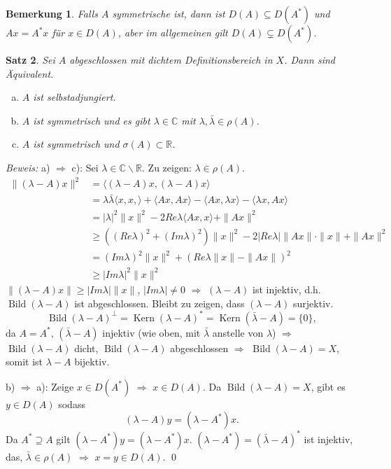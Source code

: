\documentclass[12pt]{extreport} %
\newtheorem{Satz}{Satz}[subsection]
\newtheorem{Bemerkung}[Satz]{Bemerkung}
\DeclareMathOperator{\Kern}{Kern}
\DeclareMathOperator{\Bild}{Bild}
\numberwithin{equation}{section}
\newcommand{\C}{\mathbb{C}} %
\newcommand{\R}{\mathbb{R}} %
\newcommand{\m}{\cdot}
\newcommand{\Bew}{\emph{Beweis: }}
\begin{document}
\begin{Bemerkung}
	Falls $A$ symmetrische ist, dann ist $D(A)\subseteq D(A^*)$ und $Ax = A^*x$ für $x\in D(A)$, aber im allgemeinen gilt $D(A)\subsetneq D(A^*)$.
\end{Bemerkung}

\begin{Satz}
	Sei $A$ abgeschlossen mit dichtem Definitionsbereich in $X$. Dann sind Äquivalent.
	\begin{enumerate}[a)]
		\item $A$ ist selbstadjungiert. 
		\item $A$ ist symmetrisch und es gibt $\lambda\in \C$ mit $\lambda,\bar\lambda\in \rho(A)$.
		\item $A$ ist symmetrisch und $\sigma(A)\subset \R$.
	\end{enumerate}
\end{Satz}
	
	
\Bew a) $\Rightarrow$ c): Sei $\lambda \in \C\backslash \R$. Zu zeigen: $\lambda\in\rho(A)$.
\begin{align*}
	\|(\lambda - A)x\|^2 &= \langle (\lambda - A)x, (\lambda - A)x\rangle \\
	&= \lambda\bar{\lambda} \langle x, x, \rangle + \langle Ax, Ax\rangle - \langle Ax,\lambda x\rangle - \langle \lambda x, Ax\rangle \\
	&= |\lambda|^2\|x\|^2 - 2 Re\lambda\langle Ax, x\rangle + \|Ax\|^2\\
	&\geq ((Re\lambda)^2 + (Im\lambda)^2)\|x\|^2 - 2|Re\lambda|\|Ax\|\m\|x\| + \|Ax\|^2\\
	&= (Im\lambda)^2\|x\|^2 + (Re\lambda \|x\| - \|Ax\|)^2\\
	&\geq |Im\lambda |^2 \|x\|^2
\end{align*}
$\|(\lambda - A)x\|\geq |Im\lambda|\|x\|$, $|Im \lambda|\neq 0$ $\Rightarrow$ $(\lambda - A)$ ist injektiv, d.h. $\Bild(\lambda - A)$ ist abgeschlossen. Bleibt zu zeigen, dass $(\lambda - A)$ surjektiv. 
$$\Bild(\lambda - A)^\perp = \Kern(\lambda - A)^* = \Kern(\bar{\lambda}- A) = \{0\},$$
da $A = A^*$, $(\bar{\lambda}- A)$ injektiv (wie oben, mit $\bar{\lambda}$ anstelle von $\lambda$) $\Rightarrow$ $\Bild(\lambda - A)$ dicht, $\Bild(\lambda - A)$ abgeschlossen $\Rightarrow$ $\Bild(\lambda - A) = X$, somit ist $\lambda - A$ bijektiv.

b) $\Rightarrow$ a): Zeige $x\in D(A^*)$ $\Rightarrow$ $x\in D(A)$. Da $\Bild(\lambda-A) = X$, gibt es $y\in D(A)$ sodass
$$(\lambda - A)y = (\lambda - A^*)x.$$
Da $A^*\supseteq A$ gilt $(\lambda - A^*)y = (\lambda - A^*)x$. $(\lambda - A^*) = (\bar\lambda - A)^*$ ist injektiv, das, $\bar{\lambda}\in \rho(A)$ $\Rightarrow$ $x= y\in D(A)$.
\qed
\end{document}
